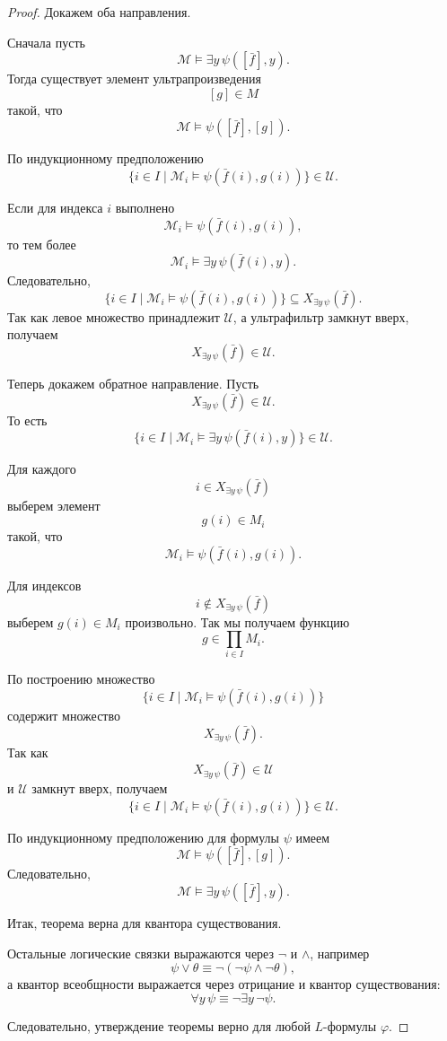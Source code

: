 \documentclass[12pt,a4paper,oneside,openany]{book}
\theoremstyle{definition}
\theoremstyle{plain}
\theoremstyle{remark}
\begin{document}
\begin{proof}
Докажем оба направления.

Сначала пусть
\[
\mathcal M\models\exists y\,\psi([\bar f],y).
\]
Тогда существует элемент ультрапроизведения
\[
[g]\in M
\]
такой, что
\[
\mathcal M\models\psi([\bar f],[g]).
\]

По индукционному предположению
\[
\{i\in I\mid
\mathcal M_i\models \psi(\bar f(i),g(i))
\}\in\mathcal U.
\]

Если для индекса $i$ выполнено
\[
\mathcal M_i\models \psi(\bar f(i),g(i)),
\]
то тем более
\[
\mathcal M_i\models \exists y\,\psi(\bar f(i),y).
\]
Следовательно,
\[
\{i\in I\mid
\mathcal M_i\models \psi(\bar f(i),g(i))
\}
\subseteq
X_{\exists y\,\psi}(\bar f).
\]
Так как левое множество принадлежит $\mathcal U$, а ультрафильтр замкнут вверх, получаем
\[
X_{\exists y\,\psi}(\bar f)\in\mathcal U.
\]

Теперь докажем обратное направление. Пусть
\[
X_{\exists y\,\psi}(\bar f)\in\mathcal U.
\]
То есть
\[
\{i\in I\mid
\mathcal M_i\models \exists y\,\psi(\bar f(i),y)
\}\in\mathcal U.
\]

Для каждого
\[
i\in X_{\exists y\,\psi}(\bar f)
\]
выберем элемент
\[
g(i)\in M_i
\]
такой, что
\[
\mathcal M_i\models\psi(\bar f(i),g(i)).
\]

Для индексов
\[
i\notin X_{\exists y\,\psi}(\bar f)
\]
выберем $g(i)\in M_i$ произвольно. Так мы получаем функцию
\[
g\in\prod_{i\in I}M_i.
\]

По построению множество
\[
\{i\in I\mid
\mathcal M_i\models\psi(\bar f(i),g(i))
\}
\]
содержит множество
\[
X_{\exists y\,\psi}(\bar f).
\]
Так как
\[
X_{\exists y\,\psi}(\bar f)\in\mathcal U
\]
и $\mathcal U$ замкнут вверх, получаем
\[
\{i\in I\mid
\mathcal M_i\models\psi(\bar f(i),g(i))
\}\in\mathcal U.
\]

По индукционному предположению для формулы $\psi$ имеем
\[
\mathcal M\models\psi([\bar f],[g]).
\]
Следовательно,
\[
\mathcal M\models\exists y\,\psi([\bar f],y).
\]

Итак, теорема верна для квантора существования.

\medskip

Остальные логические связки выражаются через $\neg$ и $\wedge$, например
\[
\psi\vee\theta
\equiv
\neg(\neg\psi\wedge\neg\theta),
\]
а квантор всеобщности выражается через отрицание и квантор существования:
\[
\forall y\,\psi
\equiv
\neg\exists y\,\neg\psi.
\]

Следовательно, утверждение теоремы верно для любой $L$-формулы $\varphi$.
\end{proof}
\end{document}
